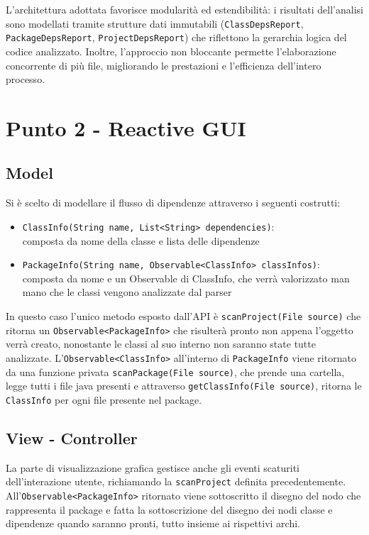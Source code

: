 \documentclass[a4paper,12pt]{report}
\begin{document}
    L’architettura adottata favorisce modularità ed estendibilità: i risultati dell’analisi sono modellati tramite strutture dati immutabili (\texttt{ClassDepsReport}, \texttt{PackageDepsReport}, \texttt{ProjectDepsReport}) che riflettono la gerarchia logica del codice analizzato. Inoltre, l’approccio non bloccante permette l’elaborazione concorrente di più file, migliorando le prestazioni e l’efficienza dell’intero processo.

    \section{Punto 2 - Reactive GUI}
    \subsection{Model}
    Si è scelto di modellare il flusso di dipendenze attraverso i seguenti costrutti:
    \begin{itemize}
        \item\texttt{ClassInfo(String name, List<String> dependencies)}: \\composta da nome della classe e lista delle dipendenze
        \item\texttt{PackageInfo(String name, Observable<ClassInfo> classInfos)}: \\composta da nome e un Observable di ClassInfo, che verrà valorizzato man mano che le classi vengono analizzate dal parser
    \end{itemize}
    In questo caso l'unico metodo esposto dall'API è \texttt{scanProject(File source)} che ritorna un
    \texttt{Observable<PackageInfo>} che risulterà pronto non appena l'oggetto verrà creato,
    nonostante le classi al suo interno non saranno state tutte analizzate.
    L'\texttt{Observable<ClassInfo>} all'interno di \texttt{PackageInfo} viene ritornato da una funzione privata
    \texttt{scanPackage(File source)}, che prende una cartella, legge tutti i file java presenti e attraverso
    \texttt{getClassInfo(File source)}, ritorna le \texttt{ClassInfo} per ogni file presente nel package.

    \subsection{View - Controller}
    La parte di visualizzazione grafica gestisce anche gli eventi scaturiti dell'interazione utente, richiamando la \texttt{scanProject} definita precedentemente.
    All'\texttt{Observable<PackageInfo>} ritornato viene sottoscritto il disegno del nodo che rappresenta il package e fatta la sottoscrizione del disegno dei nodi classe e dipendenze quando saranno pronti, tutto insieme ai rispettivi archi.
\end{document}
